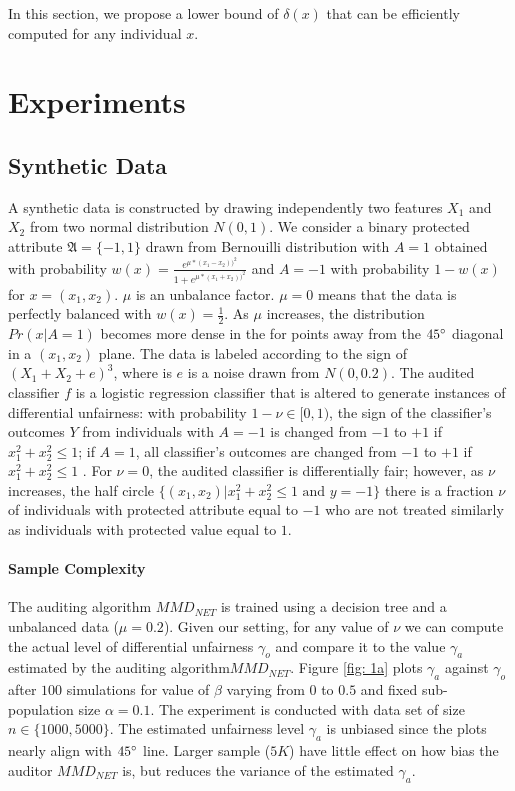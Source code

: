 \documentclass{article}
\begin{document}
In this section, we propose a lower bound of $\delta(x)$ that can be efficiently computed for any individual $x$. 


\section{Experiments}

\subsection{Synthetic Data}
A synthetic data is constructed by drawing independently two features $X_{1}$ and $X_{2}$ from two normal distribution $N(0, 1)$. We consider a binary protected attribute  $\mathfrak{A}=\{-1, 1\}$ drawn from Bernouilli distribution with $A=1$ obtained with probability $w(x)=\frac{e^{\mu * (x_{1}- x_{2}))^{2}}}{1 + e^{\mu * (x_{1}+ x_{2}))^{2}}}$ and $A=-1$ with probability $1-w(x)$ for $x=(x_{1}, x_{2})$. $\mu$ is an unbalance factor. $\mu=0$ means that the data is perfectly balanced with $w(x)=\frac{1}{2}$. As $\mu$ increases, the distribution $Pr(x|A=1)$ becomes more dense in the for points away from the $45\degree$ diagonal in a $(x_{1}, x_{2})$ plane. The data is labeled according to the sign of $(X_{1} + X_{2} + e) ^{3}$, where is $e$ is a noise drawn from $N(0, 0.2)$. The audited classifier $f$ is a logistic regression classifier that is altered to generate instances of differential unfairness: with probability $1-\nu\in[0, 1)$, the sign of the classifier's outcomes $Y$ from individuals with $A=-1$ is changed from $-1$ to $+1$ if $x^{2}_{1} + x^{2}_{2} \leq 1$; if $A=1$, all classifier's outcomes are changed from $-1$ to $+1$ if $x^{2}_{1} + x^{2}_{2} \leq 1$ . For $\nu=0$, the audited classifier is differentially fair; however, as $\nu$ increases, the half circle $\{(x_{1}, x_{2})|x^{2}_{1} + x^{2}_{2} \leq 1 \mbox{ and } y=-1\}$ there is a fraction $\nu$ of individuals with protected attribute equal to $-1$ who are not treated similarly as individuals with protected value equal to $1$. 

\bigskip
\paragraph{Sample Complexity}
The auditing algorithm $MMD_{NET}$ is trained using a decision tree and a unbalanced data ($\mu=0.2$). Given our setting, for any value of $\nu$ we can compute the actual level of differential unfairness $\gamma_{o}$ and compare it to the value  $\gamma_{a}$ estimated by the auditing algorithm$MMD_{NET}$.  Figure \ref{fig: 1a} plots $\gamma_{a}$ against $\gamma_{o}$ after $100$ simulations for value of $\beta$ varying from $0$ to $0.5$ and fixed sub-population size $\alpha=0.1$. The experiment is conducted with data set of size $n\in \{1000, 5000\}$. The estimated unfairness level $\gamma_{a}$ is unbiased since the plots nearly align with $45\degree$ line. Larger sample ($5K$) have little effect on how bias the auditor $MMD_{NET}$ is, but reduces the variance of the estimated $\gamma_{a}$.  
\end{document}
